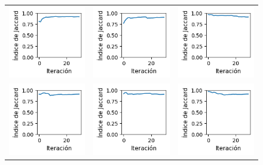 \begin{figure}[ht]
\begin{tabular}{ccc}
        \includegraphics[width=4.5cm]{../Plots/score_epoch_12.png} &
        \includegraphics[width=4.5cm]{../Plots/score_epoch_13.png} &
        \includegraphics[width=4.5cm]{../Plots/score_epoch_14.png} \\

        \includegraphics[width=4.5cm]{../Plots/score_epoch_15.png} &
        \includegraphics[width=4.5cm]{../Plots/score_epoch_16.png} &
        \includegraphics[width=4.5cm]{../Plots/score_epoch_17.png} \\
    \end{tabular}


\end{figure}
